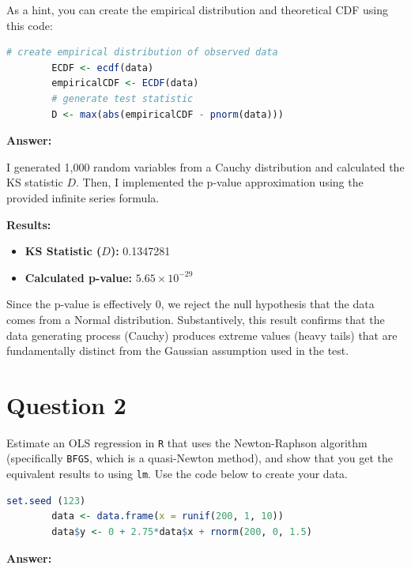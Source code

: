 \documentclass[12pt,letterpaper]{article}
\begin{document}
	
	\noindent As a hint, you can create the empirical distribution and theoretical CDF using this code:
	
	\begin{lstlisting}[language=R]
		# create empirical distribution of observed data
		ECDF <- ecdf(data)
		empiricalCDF <- ECDF(data)
		# generate test statistic
		D <- max(abs(empiricalCDF - pnorm(data))) \end{lstlisting}
	
	\vspace{0.5cm}
	\textbf{Answer:}
	
	I generated 1,000 random variables from a Cauchy distribution and calculated the KS statistic $D$. Then, I implemented the p-value approximation using the provided infinite series formula. 
	
	
	
	\vspace{0.3cm}
	\noindent \textbf{Results:}
	\begin{itemize}
		\item \textbf{KS Statistic ($D$):} 0.1347281
		\item \textbf{Calculated p-value:} $5.65 \times 10^{-29}$
	\end{itemize}
	
	Since the p-value is effectively 0, we reject the null hypothesis that the data comes from a Normal distribution. Substantively, this result confirms that the data generating process (Cauchy) produces extreme values (heavy tails) that are fundamentally distinct from the Gaussian assumption used in the test.
	
	\newpage
	
	\section*{Question 2}
	\noindent Estimate an OLS regression in \texttt{R} that uses the Newton-Raphson algorithm (specifically \texttt{BFGS}, which is a quasi-Newton method), and show that you get the equivalent results to using \texttt{lm}. Use the code below to create your data.
	\vspace{.5cm}
	\begin{lstlisting}[language=R]
		set.seed (123)
		data <- data.frame(x = runif(200, 1, 10))
		data$y <- 0 + 2.75*data$x + rnorm(200, 0, 1.5)
	\end{lstlisting}
	
	\vspace{0.5cm}
	\textbf{Answer:}
	
\end{document}
